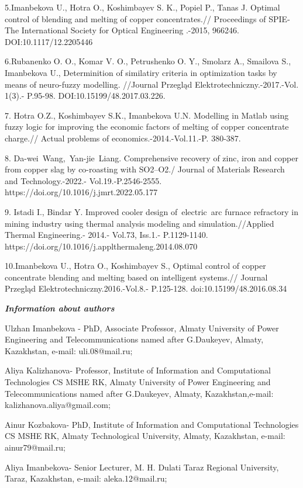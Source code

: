 5.Imanbekova U., Hotra O., Koshimbayev S. K., Popiel P., Tanas J.
Optimal control of blending and melting of copper concentrates.//
Proceedings of SPIE-The International Society for Optical Engineering
.-2015, 966246. DOI:10.1117/12.2205446

6.Rubanenko O. O., Komar V. O., Petrushenko O. Y., Smolarz A., Smailova
S., Imanbekova U., Determinition of similatiry criteria in optimization
tasks by means of neuro-fuzzy modelling. //Journal Przegląd
Elektrotechniczny.-2017.-Vol. 1(3).- P.95-98.
DOI:10.15199/48.2017.03.226.

7. Hotra O.Z., Koshimbayev S.K., Imanbekova U.N. Modelling in Matlab
using fuzzy logic for improving the economic factors of melting of
copper concentrate charge.// Actual problems of
economics.-2014.-Vol.11.-P. 380-387.

8. Da-wei~Wang,~Yan-jie~Liang. Comprehensive recovery of zinc, iron and
copper from copper slag by co-roasting with SO2--O2./ Journal of
Materials Research and Technology.-2022.- Vol.19.-P.2546-2555.
https://doi.org/10.1016/j.jmrt.2022.05.177

9. Istadi I., Bindar Y. Improved cooler design of~electric~arc furnace
refractory in mining industry using thermal analysis modeling and
simulation.//Applied Thermal Engineering.- 2014.- Vol.73, Iss.1.-
P.1129-1140. https://doi.org/10.1016/j.applthermaleng.2014.08.070

10.Imanbekova U., Hotra O., Koshimbayev S., Optimal control of copper
concentrate blending and melting based on intelligent systems.// Journal
Przegląd Elektrotechniczny.2016.-Vol.8.- P.125-128.
doi:10.15199/48.2016.08.34

\emph{\textbf{Information about authors}}

Ulzhan Imanbekova - PhD, Associate Professor, Almaty University of Power
Engineering and Telecommunications named after G.Daukeyev, Almaty,
Kazakhstan, e-mail: uli.08@mail.ru;

Aliya Kalizhanova- Professor, Institute of Information and Computational
Technologies CS MSHE RK, Almaty University of Power Engineering and
Telecommunications named after G.Daukeyev, Almaty, Kazakhstan,e-mail:
kalizhanova.aliya@gmail.com;

Ainur Kozbakova- PhD, Institute of Information and Computational
Technologies CS MSHE RK, Almaty Technological University, Almaty,
Kazakhstan, e-mail: ainur79@mail.ru;

Aliya Imanbekova- Senior Lecturer, M. H. Dulati Taraz Regional
University, Taraz, Kazakhstan, e-mail: aleka.12@mail.ru;

